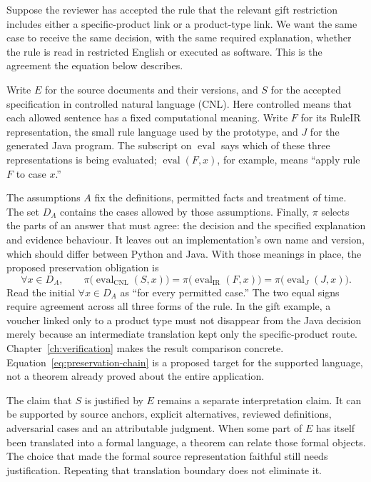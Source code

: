 \documentclass[12pt,a4paper,oneside,openany]{book}
\newcommand{\IR}{\mathrm{IR}}
\newcommand{\CNL}{\mathrm{CNL}}
\newcommand{\eval}{\operatorname{eval}}
\begin{document}
Suppose the reviewer has accepted the rule that the relevant gift restriction
includes either a specific-product link or a product-type link. We want the same
case to receive the same decision, with the same required explanation, whether
the rule is read in restricted English or executed as software. This is the
agreement the equation below describes.

Write $E$ for the source documents and their versions, and $S$ for the accepted
specification in controlled natural language (CNL). Here controlled means that
each allowed sentence has a fixed computational meaning. Write $F$ for its
RuleIR representation, the small rule language used by the prototype, and $J$
for the generated Java program. The subscript on $\eval$ says which of these
three representations is being evaluated; $\eval(F,x)$, for example, means
``apply rule $F$ to case $x$.''

The assumptions $A$ fix the definitions, permitted facts and treatment of time.
The set $D_A$ contains the cases allowed by those assumptions. Finally, $\pi$
selects the parts of an answer that must agree: the decision and the specified
explanation and evidence behaviour. It leaves out an implementation's own name
and version, which should differ between Python and Java. With those meanings in
place, the proposed preservation obligation is
\begin{equation}
 \forall x\in D_A,\qquad
 \pi\bigl(\eval_{\CNL}(S,x)\bigr)
 =\pi\bigl(\eval_{\IR}(F,x)\bigr)
 =\pi\bigl(\eval_{J}(J,x)\bigr).
 \label{eq:preservation-chain}
\end{equation}
Read the initial $\forall x\in D_A$ as ``for every permitted case.'' The two
equal signs require agreement across all three forms of the rule. In the gift
example, a voucher linked only to a product type must not disappear from the
Java decision merely because an intermediate translation kept only the
specific-product route. Chapter~\ref{ch:verification} makes the result comparison
concrete. Equation~\eqref{eq:preservation-chain} is a proposed target for the
supported language, not a theorem already proved about the entire application.

The claim that $S$ is justified by $E$ remains a separate interpretation claim.
It can be supported by source anchors, explicit alternatives, reviewed
definitions, adversarial cases and an attributable judgment. When some part of
$E$ has itself been translated into a formal language, a theorem can relate
those formal objects. The choice that made the formal source representation
faithful still needs justification. Repeating that translation boundary does not
eliminate it.
\end{document}

